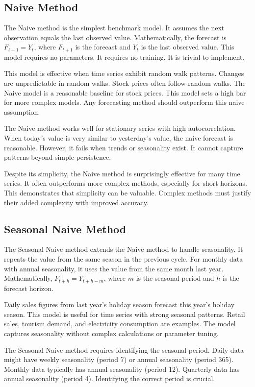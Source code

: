 \subsection{Naive Method}

The Naive method is the simplest benchmark model. It assumes the next observation equals the last observed value. Mathematically, the forecast is \(F_{t+1} = Y_t\), where \(F_{t+1}\) is the forecast and \(Y_t\) is the last observed value. This model requires no parameters. It requires no training. It is trivial to implement.

This model is effective when time series exhibit random walk patterns. Changes are unpredictable in random walks. Stock prices often follow random walks. The Naive model is a reasonable baseline for stock prices. This model sets a high bar for more complex models. Any forecasting method should outperform this naive assumption.

The Naive method works well for stationary series with high autocorrelation. When today's value is very similar to yesterday's value, the naive forecast is reasonable. However, it fails when trends or seasonality exist. It cannot capture patterns beyond simple persistence.

Despite its simplicity, the Naive method is surprisingly effective for many time series. It often outperforms more complex methods, especially for short horizons. This demonstrates that simplicity can be valuable. Complex methods must justify their added complexity with improved accuracy.

\subsection{Seasonal Naive Method}

The Seasonal Naive method extends the Naive method to handle seasonality. It repeats the value from the same season in the previous cycle. For monthly data with annual seasonality, it uses the value from the same month last year. Mathematically, \(F_{t+h} = Y_{t+h-m}\), where \(m\) is the seasonal period and \(h\) is the forecast horizon.

Daily sales figures from last year's holiday season forecast this year's holiday season. This model is useful for time series with strong seasonal patterns. Retail sales, tourism demand, and electricity consumption are examples. The model captures seasonality without complex calculations or parameter tuning.

The Seasonal Naive method requires identifying the seasonal period. Daily data might have weekly seasonality (period 7) or annual seasonality (period 365). Monthly data typically has annual seasonality (period 12). Quarterly data has annual seasonality (period 4). Identifying the correct period is crucial.

